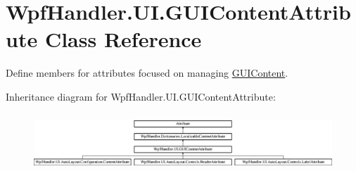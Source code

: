 \hypertarget{class_wpf_handler_1_1_u_i_1_1_g_u_i_content_attribute}{}\section{Wpf\+Handler.\+U\+I.\+G\+U\+I\+Content\+Attribute Class Reference}
\label{class_wpf_handler_1_1_u_i_1_1_g_u_i_content_attribute}


Define members for attributes focused on managing \mbox{\hyperlink{class_wpf_handler_1_1_u_i_1_1_g_u_i_content}{G\+U\+I\+Content}}.  


Inheritance diagram for Wpf\+Handler.\+U\+I.\+G\+U\+I\+Content\+Attribute\+:\begin{figure}[H]
\begin{center}
\leavevmode
\includegraphics[height=2.170543cm]{d3/dd4/class_wpf_handler_1_1_u_i_1_1_g_u_i_content_attribute}
\end{center}
\end{figure}
